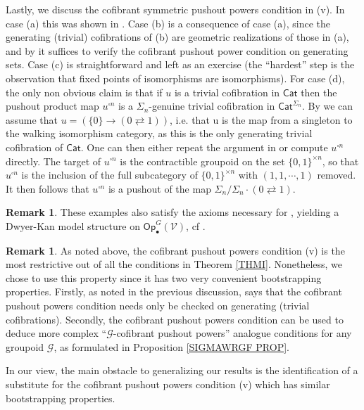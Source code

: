\documentclass[a4paper,10pt
]{article}%
\numberwithin{equation}{section}
\numberwithin{figure}{section}
\theoremstyle{definition} %
\newtheorem{remark}[equation]{Remark}%
\newcommand{\Op}{\mathsf{Op}}%
\newcommand{\V}{\ensuremath{\mathcal V}}
\newcommand{\G}{\ensuremath{\mathcal G}}
\newcommand{\1}{\ensuremath{\mathbbm 1}}%
\begin{document}
Lastly, we discuss the cofibrant symmetric pushout powers condition in (v).
In case (a) this was shown in 
\cite[Ex. 6.19]{BP21}.
Case (b) is a consequence of case (a), 
since the generating (trivial) cofibrations of (b) are geometric realizations of those in (a),
and by \cite[Rem. 6.17]{BP21}
it suffices to verify the cofibrant pushout power condition
on generating sets.
Case (c) is straightforward and left as an exercise 
(the ``hardest'' step is the observation that fixed points of isomorphisms are isomorphisms).
For case (d), the only non obvious claim is that
if $u$ is a trivial cofibration in $\mathsf{Cat}$
then the pushout product map $u^{\square n}$
is a $\Sigma_n$-genuine trivial cofibration in $\mathsf{Cat}^{\Sigma_n}$.
By \cite[Rem. 6.17]{BP21}
we can assume that $u = \left(\{0\} \to (0\rightleftarrows 1)\right)$,
i.e. that u is the map from a singleton to the walking isomorphism category,
as this is the only generating trivial cofibration of 
$\mathsf{Cat}$.
One can then either repeat the argument in \cite[Ex. 6.19]{BP21}
or compute $u^{\square n}$ directly.
The target of $u^{\square n}$
is the contractible groupoid on the set $\{0,1\}^{\times n}$,
so that $u^{\square n}$
is the inclusion of the full subcategory of 
$\{0,1\}^{\times n}$
with $(1,1,\cdots,1)$ removed.
It then follows that $u^{\square n}$
is a pushout of the map
$\Sigma_n/\Sigma_n \cdot (0 \rightleftarrows 1)$.

\begin{remark}
        These examples also satisfy the axioms necessary for \cite[Thm. \ref{AC-THMA}]{BP_ACOP},
        yielding a Dwyer-Kan model structure on $\Op_\bullet^G(\V)$, cf \cite[\S \ref{AC-EXAMPLES SEC}]{BP_ACOP}.
\end{remark}


\begin{remark}\label{CPPWHY REM}
	As noted above, the cofibrant pushout powers
	condition (v) is the most restrictive 
	out of all the conditions in 
	Theorem \ref{THMI}. %
	Nonetheless, we chose to use this property 
	since it has two very convenient bootstrapping properties.
	Firstly, as noted in the previous discussion, \cite[Rem. 6.17]{BP21}
	says that the cofibrant pushout powers condition needs only be checked on generating (trivial cofibrations).
	Secondly, the cofibrant pushout powers condition 
	can be used to deduce more complex
	``$\G$-cofibrant pushout powers'' analogue conditions for any groupoid $\G$,
	as formulated in Proposition \ref{SIGMAWRGF PROP}.
	
	In our view, the main obstacle to generalizing our results is the identification of 
	a substitute for the cofibrant pushout powers condition (v)
	which has similar bootstrapping properties.
\end{remark}
\end{document}
